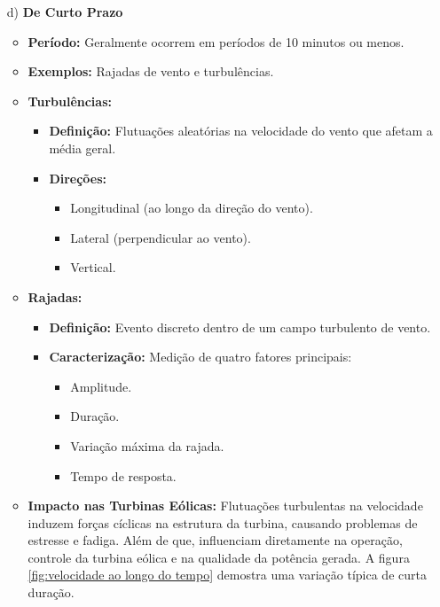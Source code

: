 \begin{itemize}
    \item[d)] \textbf{De Curto Prazo}
    \begin{itemize}
        \item \textbf{Período:} Geralmente ocorrem em períodos de 10 minutos ou menos.
        \item \textbf{Exemplos:} Rajadas de vento e turbulências.
        \item \textbf{Turbulências:}
        \begin{itemize}
            \item \textbf{Definição:} Flutuações aleatórias na velocidade do vento que afetam a média geral.
            \item \textbf{Direções:}
            \begin{itemize}
                \item Longitudinal (ao longo da direção do vento).
                \item Lateral (perpendicular ao vento).
                \item Vertical.
            \end{itemize}
        \end{itemize}
        \item \textbf{Rajadas:}
        \begin{itemize}
            \item \textbf{Definição:} Evento discreto dentro de um campo turbulento de vento.
            \item \textbf{Caracterização:} Medição de quatro fatores principais:
            \begin{itemize}
                \item Amplitude.
                \item Duração.
                \item Variação máxima da rajada.
                \item Tempo de resposta.
            \end{itemize}
        \end{itemize}
        \item \textbf{Impacto nas Turbinas Eólicas:} Flutuações turbulentas na velocidade induzem forças cíclicas na estrutura da turbina, causando problemas de estresse e fadiga. Além de que, influenciam diretamente na operação, controle da turbina eólica e na qualidade da potência gerada. A figura \ref{fig:velocidade ao longo do tempo} demostra uma variação típica de curta duração. 
    \end{itemize}
\end{itemize}

